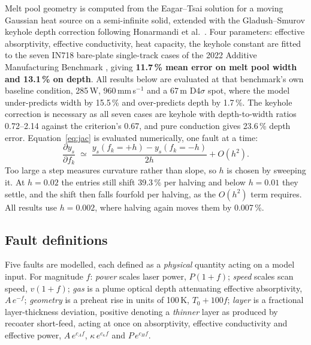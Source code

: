 \documentclass[final,5p,times,twocolumn]{elsarticle}
\begin{document}
Melt pool geometry is computed from the Eagar--Tsai solution for a moving Gaussian
heat source on a semi-infinite solid, extended with the Gladush--Smurov keyhole
depth correction following Honarmandi et al.\ \cite{Hon2021}. Four parameters: effective absorptivity, effective conductivity, heat capacity, the keyhole
constant are fitted to the seven IN718 bare-plate single-track cases of the
2022 Additive Manufacturing Benchmark \cite{Weaver2024}, giving \textbf{11.7\,\%
mean error on melt pool width and 13.1\,\% on depth}. All results below are evaluated at that benchmark's own baseline condition,
285\,W, 960\,mm\,s$^{-1}$ and a 67\,\textmu m D4$\sigma$ spot, where the model under-predicts width by 15.5\,\% and over-predicts depth by
1.7\,\%. The keyhole correction
is necessary as all seven cases are keyhole with depth-to-width
ratios 0.72--2.14 against the criterion's 0.67, and pure conduction gives 23.6\,\% depth error. Equation~\eqref{eq:jac} is evaluated numerically, one fault at a time:
%
\begin{equation}
\frac{\partial y_s}{\partial f_k} \;\simeq\;
\frac{y_s(f_k = +h) - y_s(f_k = -h)}{2h} + O(h^{2}).
\label{eq:cd}
\end{equation}
%
Too large a step measures curvature rather than slope, so $h$ is chosen by
sweeping it. At $h=0.02$ the entries still shift 39.3\,\% per halving and below
$h=0.01$ they settle, and the shift then falls fourfold per halving, as the
$O(h^{2})$ term requires. All results use $h=0.002$, where halving again moves
them by 0.007\,\%.

\subsection{Fault definitions}

Five faults are modelled, each defined as a \emph{physical} quantity acting on a
model input. For
magnitude $f$: \emph{power} scales laser power, $P(1+f)$; \emph{speed} scales
scan speed, $v(1+f)$; \emph{gas} is a plume optical depth attenuating effective
absorptivity, $A\,e^{-f}$; \emph{geometry} is a preheat rise in units of 100\,K,
$T_0+100f$; \emph{layer} is a fractional layer-thickness deviation, positive
denoting a \emph{thinner} layer as produced by recoater short-feed, acting at
once on absorptivity, effective conductivity and effective power,
$A\,e^{c_A f}$, $\kappa\,e^{c_\kappa f}$ and $P\,e^{c_H f}$.
\end{document}
